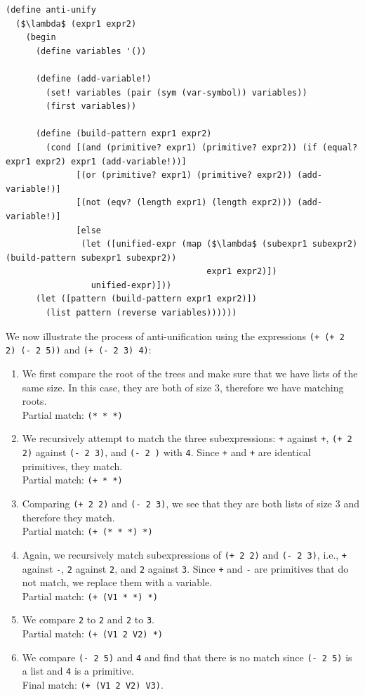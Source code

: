 \documentclass[a4paper,10pt]{article}
\begin{document}
\begin{lstlisting}[frame=trbl]
(define anti-unify
  ($\lambda$ (expr1 expr2)
    (begin
      (define variables '())

      (define (add-variable!)
        (set! variables (pair (sym (var-symbol)) variables))
        (first variables))
      
      (define (build-pattern expr1 expr2)
        (cond [(and (primitive? expr1) (primitive? expr2)) (if (equal? expr1 expr2) expr1 (add-variable!))]
              [(or (primitive? expr1) (primitive? expr2)) (add-variable!)]
              [(not (eqv? (length expr1) (length expr2))) (add-variable!)]
              [else
               (let ([unified-expr (map ($\lambda$ (subexpr1 subexpr2) (build-pattern subexpr1 subexpr2))
                                        expr1 expr2)])
                 unified-expr)]))
      (let ([pattern (build-pattern expr1 expr2)])
        (list pattern (reverse variables))))))
\end{lstlisting}

We now illustrate the process of anti-unification using the expressions \texttt{(+ (+ 2 2) (- 2 5))} and \texttt{(+ (- 2 3) 4)}:
\begin{enumerate}
\item We first compare the root of the trees and make sure that we have lists of the same size. In this case, they are both of size $3$, therefore we have matching roots. \\
  Partial match: \texttt{(* * *)}
\item We recursively attempt to match the three subexpressions: \texttt{+} against \texttt{+}, \texttt{(+ 2 2)} against \texttt{(- 2 3)}, and \texttt{(- 2 )} with \texttt{4}. Since \texttt{+} and \texttt{+} are identical primitives, they match. \\
  Partial match: \texttt{(+ * *)}
\item Comparing \texttt{(+ 2 2)} and \texttt{(- 2 3)}, we see that they are both lists of size 3 and therefore they match. \\
  Partial match: \texttt{(+ (* * *) *)}
\item Again, we recursively match subexpressions of \texttt{(+ 2 2)} and \texttt{(- 2 3)}, i.e., \texttt{+} against \texttt{-}, \texttt{2} against \texttt{2}, and \texttt{2} against \texttt{3}. Since \texttt{+} and \texttt{-} are primitives that do not match, we replace them with a variable. \\
  Partial match: \texttt{(+ (V1 * *) *)}
\item We compare \texttt{2} to \texttt{2} and \texttt{2} to \texttt{3}. \\
  Partial match: \texttt{(+ (V1 2 V2) *)}
\item We compare \texttt{(- 2 5)} and \texttt{4} and find that there is no match since \texttt{(- 2 5)} is a list and \texttt{4} is a primitive. \\
  Final match: \texttt{(+ (V1 2 V2) V3)}.
\end{enumerate}
\end{document}

